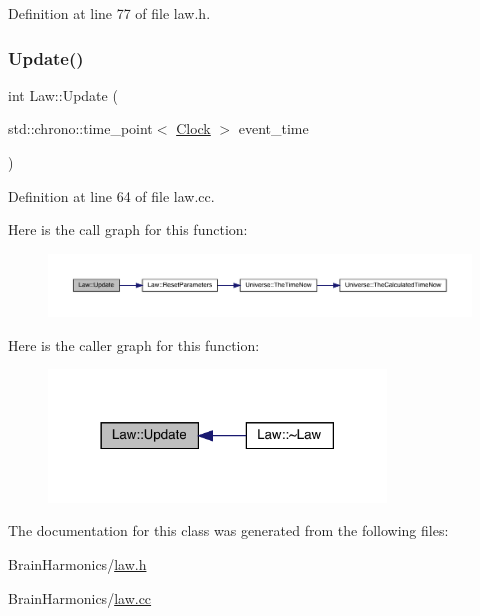 Definition at line 77 of file law.\+h.

\mbox{\label{class_law_a0240b10c679b671039dbf10771342ea7}} 
\subsubsection{\texorpdfstring{Update()}{Update()}}
{\footnotesize\ttfamily int Law\+::\+Update (\begin{DoxyParamCaption}\item[{std\+::chrono\+::time\+\_\+point$<$ \hyperlink{universe_8h_a0ef8d951d1ca5ab3cfaf7ab4c7a6fd80}{Clock} $>$}]{event\+\_\+time }\end{DoxyParamCaption})}



Definition at line 64 of file law.\+cc.

Here is the call graph for this function\+:
\nopagebreak
\begin{figure}[H]
\begin{center}
\leavevmode
\includegraphics[width=350pt]{class_law_a0240b10c679b671039dbf10771342ea7_cgraph}
\end{center}
\end{figure}
Here is the caller graph for this function\+:
\nopagebreak
\begin{figure}[H]
\begin{center}
\leavevmode
\includegraphics[width=254pt]{class_law_a0240b10c679b671039dbf10771342ea7_icgraph}
\end{center}
\end{figure}


The documentation for this class was generated from the following files\+:\begin{DoxyCompactItemize}
\item 
Brain\+Harmonics/\hyperlink{law_8h}{law.\+h}\item 
Brain\+Harmonics/\hyperlink{law_8cc}{law.\+cc}\end{DoxyCompactItemize}
